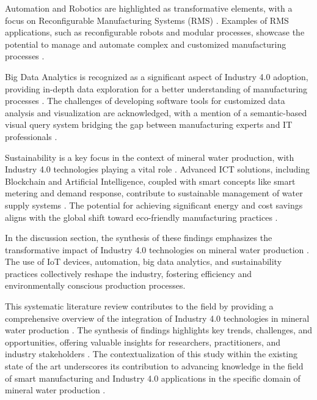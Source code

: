 \documentclass[conference]{IEEEtran}
\begin{document}
Automation and Robotics are highlighted as transformative elements, with a focus on Reconfigurable Manufacturing Systems (RMS) \cite{Morgan2021}. Examples of RMS applications, such as reconfigurable robots and modular processes, showcase the potential to manage and automate complex and customized manufacturing processes \cite{Morgan2021}.

Big Data Analytics is recognized as a significant aspect of Industry 4.0 adoption, providing in-depth data exploration for a better understanding of manufacturing processes \cite{Berges2021}. The challenges of developing software tools for customized data analysis and visualization are acknowledged, with a mention of a semantic-based visual query system bridging the gap between manufacturing experts and IT professionals \cite{Berges2021}.

Sustainability is a key focus in the context of mineral water production, with Industry 4.0 technologies playing a vital role \cite{Bai2020}. Advanced ICT solutions, including Blockchain and Artificial Intelligence, coupled with smart concepts like smart metering and demand response, contribute to sustainable management of water supply systems \cite{Bai2020}\cite{Grigoras2018}. The potential for achieving significant energy and cost savings aligns with the global shift toward eco-friendly manufacturing practices \cite{Bai2020}.

In the discussion section, the synthesis of these findings emphasizes the transformative impact of Industry 4.0 technologies on mineral water production \cite{Ali2023}\cite{Morgan2021}\cite{Bai2020}. The use of IoT devices, automation, big data analytics, and sustainability practices collectively reshape the industry, fostering efficiency and environmentally conscious production processes\cite{Ali2023}\cite{Soori2023}\cite{Bai2020}.

This systematic literature review contributes to the field by providing a comprehensive overview of the integration of Industry 4.0 technologies in mineral water production \cite{Ali2023}. The synthesis of findings highlights key trends, challenges, and opportunities, offering valuable insights for researchers, practitioners, and industry stakeholders \cite{Ali2023}\cite{Soori2023}\cite{Bai2020}. The contextualization of this study within the existing state of the art underscores its contribution to advancing knowledge in the field of smart manufacturing and Industry 4.0 applications in the specific domain of mineral water production \cite{Ali2023}\cite{Soori2023}.
\end{document}

